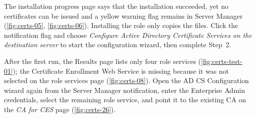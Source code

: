 {The installation progress page says that the installation succeeded, yet no certificates can be issued and a yellow warning flag remains in Server Manager (\autoref{fig:certs-05}, \autoref{fig:certs-06}).}
{Installing the role only copies the files. Click the notification flag and choose \emph{Configure Active Directory Certificate Services on the destination server} to start the configuration wizard, then complete Step~2.}

{After the first run, the Results page lists only four role services (\autoref{fig:certs-test-01}); the Certificate Enrollment Web Service is missing because it was not selected on the role services page (\autoref{fig:certs-08}).}
{Open the AD CS Configuration wizard again from the Server Manager notification, enter the Enterprise Admin credentials, select the remaining role service, and point it to the existing CA on the \emph{CA for CES} page (\autoref{fig:certs-26}).}
